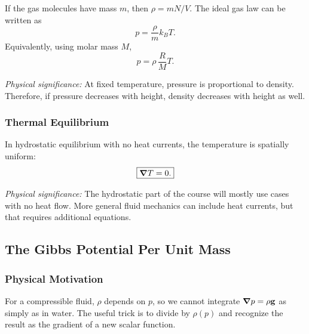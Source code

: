 \documentclass[../main.tex]{subfiles}
\begin{document}
If the gas molecules have mass $m$, then $\rho=mN/V$. The ideal gas law can be written as
\begin{equation}
  \boxed{p=\frac{\rho}{m}k_B T.}
  \label{eq:lec10_ideal_gas_density_form}
\end{equation}
Equivalently, using molar mass $M$,
\begin{equation}
  \boxed{p=\rho\,\frac{R}{M}T.}
  \label{eq:lec10_ideal_gas_molar_form}
\end{equation}

\textit{Physical significance:} At fixed temperature, pressure is proportional to density. Therefore, if pressure decreases with height, density decreases with height as well.

\subsubsection*{Thermal Equilibrium}
In hydrostatic equilibrium with no heat currents, the temperature is spatially uniform:
\begin{equation}
  \boxed{\grad T=0.}
  \label{eq:lec10_uniform_temperature}
\end{equation}

\textit{Physical significance:} The hydrostatic part of the course will mostly use cases with no heat flow. More general fluid mechanics can include heat currents, but that requires additional equations.

\subsection{The Gibbs Potential Per Unit Mass}\label{sec:lec10:gibbs-potential}

\subsubsection*{Physical Motivation}
For a compressible fluid, $\rho$ depends on $p$, so we cannot integrate $\grad p=\rho\mathbf{g}$ as simply as in water. The useful trick is to divide by $\rho(p)$ and recognize the result as the gradient of a new scalar function.
\end{document}
